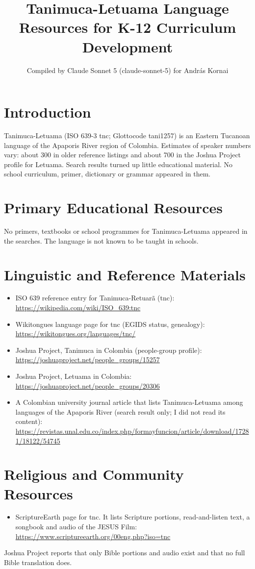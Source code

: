 \documentclass[12pt]{article}
\title{Tanimuca-Letuama Language Resources for K-12 Curriculum Development}
\author{Compiled by Claude Sonnet 5 (claude-sonnet-5) for Andr\'as Kornai}
\date{}
\begin{document}
\maketitle

\section{Introduction}
Tanimuca-Letuama (ISO 639-3 tnc; Glottocode tani1257) is an Eastern Tucanoan language of the Apaporis River region of Colombia. Estimates of speaker numbers vary: about 300 in older reference listings and about 700 in the Joshua Project profile for Letuama. Search results turned up little educational material. No school curriculum, primer, dictionary or grammar appeared in them.

\section{Primary Educational Resources}
No primers, textbooks or school programmes for Tanimuca-Letuama appeared in the searches. The language is not known to be taught in schools.

\section{Linguistic and Reference Materials}
\begin{itemize}
\item ISO 639 reference entry for Tanimuca-Retuar\~a (tnc): \url{https://wikipedia.com/wiki/ISO_639:tnc}
\item Wikitongues language page for tnc (EGIDS status, genealogy): \url{https://wikitongues.org/languages/tnc/}
\item Joshua Project, Tanimuca in Colombia (people-group profile): \url{https://joshuaproject.net/people_groups/15257}
\item Joshua Project, Letuama in Colombia: \url{https://joshuaproject.net/people_groups/20306}
\item A Colombian university journal article that lists Tanimuca-Letuama among languages of the Apaporis River (search result only; I did not read its content): \url{https://revistas.unal.edu.co/index.php/formayfuncion/article/download/17281/18122/54745}
\end{itemize}

\section{Religious and Community Resources}
\begin{itemize}
\item ScriptureEarth page for tnc. It lists Scripture portions, read-and-listen text, a songbook and audio of the JESUS Film: \url{https://www.scriptureearth.org/00eng.php?iso=tnc}
\end{itemize}
Joshua Project reports that only Bible portions and audio exist and that no full Bible translation does.
\end{document}
